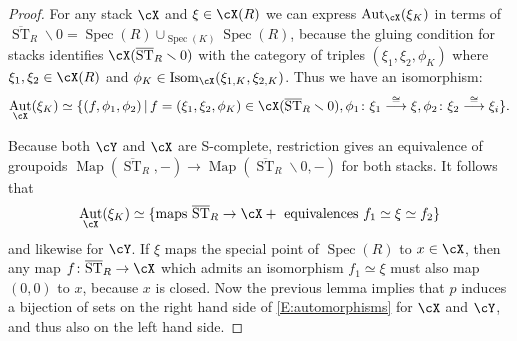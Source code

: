 \documentclass[a4paper]{amsart}
\numberwithin{equation}{section}
\theoremstyle{plain}
\theoremstyle{definition}
\DeclareMathOperator{\Spec}{Spec}
\DeclareMathOperator{\ST}{ST}
\DeclareMathOperator{\Aut}{Aut}
\newcommand{\co}{\colon}
\DeclareMathOperator{\Isom}{Isom}
\DeclareMathOperator{\Map}{Map}
\def\oST{\overline{\ST}}
\newcommand{\map}[1]{\stackrel{#1}{\longrightarrow}}
\begin{document}
\begin{proof}{For any stack $\cX$ and $\xi\in \cX(R)$ we can express $\Aut_{\cX}(\xi_K)$ in terms of $\oST_R \smallsetminus 0=\Spec(R) \cup_{\Spec(K)} \Spec(R)$, because the gluing condition for stacks identifies $\cX(\oST_R \smallsetminus 0)$ with the category of triples $(\xi_1,\xi_2,\phi_K)$ where $\xi_1,\xi_2\in \cX(R)$ and $\phi_K\in \Isom_{\cX}(\xi_{1,K},\xi_{2,K})$. Thus we have an isomorphism:
		$$
	\Aut_{\cX}(\xi_K) \simeq \{ (f,\phi_1,\phi_2) \,|\, f=(\xi_1,\xi_2,\phi_K) \in \cX(\oST_R \smallsetminus 0), \phi_1\colon \xi_1 \map{\cong}\xi, \phi_2\colon \xi_2 \map{\cong} \xi_i \}.
		$$ }
	


Because both $\cY$ and $\cX$ are  {\textsf{S}}-complete, restriction gives an equivalence of groupoids $\Map(\oST_R, - ) \to \Map(\oST_R \smallsetminus 0,-)$ for both stacks. It follows that
\begin{equation} \label{E:automorphisms}
\Aut_\cX(\xi_K) \simeq \{ \text{maps } \oST_R \to \cX + \text{ equivalences } f_1 \simeq \xi \simeq f_2\}
\end{equation}
and likewise for $\cY$. If $\xi$ maps the special point of $\Spec(R)$ to $x \in \cX$, then any map $f \co \oST_R \to \cX$ which admits an isomorphism $f_1 \simeq \xi$ must also map $(0,0)$ to $x$, because $x$ is closed. Now the previous lemma implies that $p$ induces a bijection of sets on the right hand side of \eqref{E:automorphisms} for $\cX$ and $\cY$, and thus also on the left hand side.
\end{proof}
\end{document}
